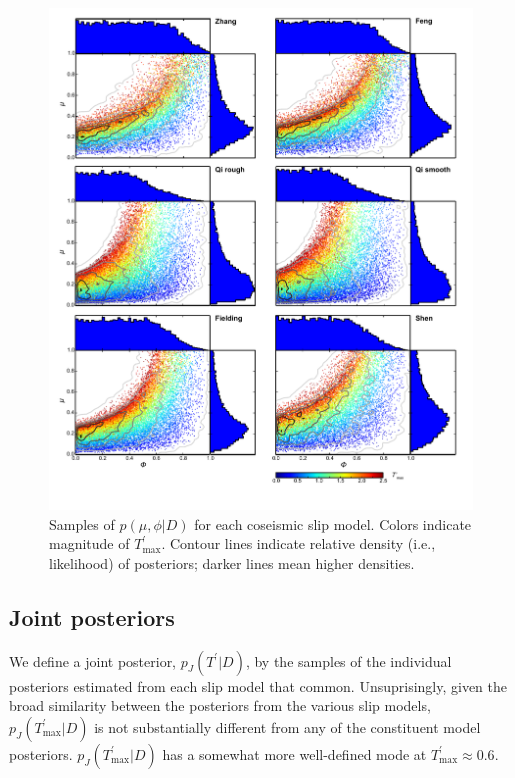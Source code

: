 \documentclass[twocolumn,jgrga]{AGUTeX}
\begin{document}
\begin{article}
\begin{figure}[htbp]
\centering
\includegraphics[width=40pc]{../figures/mu_phi_fms.pdf}
\caption{Samples of $p(\mu,\phi | D)$ for each coseismic slip model.
Colors indicate magnitude of $T^\prime_{\mathrm{max}}$. Contour lines
indicate relative density (i.e., likelihood) of posteriors; darker lines
mean higher densities.}
\label{fig:mu_phi_scatters}
\end{figure}

\subsection{Joint posteriors}\label{joint-posteriors}

We define a joint posterior, $p_{J}(T^\prime | D)$, by the samples of
the individual posteriors estimated from each slip model that common.
Unsuprisingly, given the broad similarity between the posteriors from
the various slip models, $p_{J}(T^\prime_{\mathrm{max}} | D)$ is not
substantially different from any of the constituent model posteriors.
$p_{J}(T^\prime_{\mathrm{max}} | D)$ has a somewhat more well-defined
mode at $T^\prime_{\mathrm{max}} \approx 0.6$.


\end{article}
\end{document}
